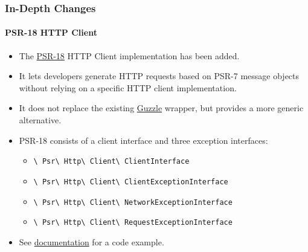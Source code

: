 
\begin{frame}[fragile]
	\frametitle{In-Depth Changes}
	\framesubtitle{PSR-18 HTTP Client}

	\begin{itemize}
		\item The \href{https://www.php-fig.org/psr/psr-18/}{PSR-18}
			HTTP Client implementation has been added.
		\item It lets developers generate HTTP requests based on PSR-7
			message objects without relying on a specific HTTP client implementation.
		\item It does not replace the existing \href{http://guzzlephp.org/}{Guzzle}
			wrapper, but provides a more generic alternative.
		\item PSR-18 consists of a client interface and three exception interfaces:

			\begin{itemize}\smaller
				\item \texttt{\textbackslash
					Psr\textbackslash
					Http\textbackslash
					Client\textbackslash
					ClientInterface}
				\item \texttt{\textbackslash
					Psr\textbackslash
					Http\textbackslash
					Client\textbackslash
					ClientExceptionInterface}
				\item \texttt{\textbackslash
					Psr\textbackslash
					Http\textbackslash
					Client\textbackslash
					NetworkExceptionInterface}
				\item \texttt{\textbackslash
					Psr\textbackslash
					Http\textbackslash
					Client\textbackslash
					RequestExceptionInterface}
			\end{itemize}\normalsize

		\item See
			\href{https://docs.typo3.org/c/typo3/cms-core/master/en-us/Changelog/10.1/Feature-89216-PSR-18HTTPClientImplementation.html}{documentation}
			for a code example.

	\end{itemize}

\end{frame}


